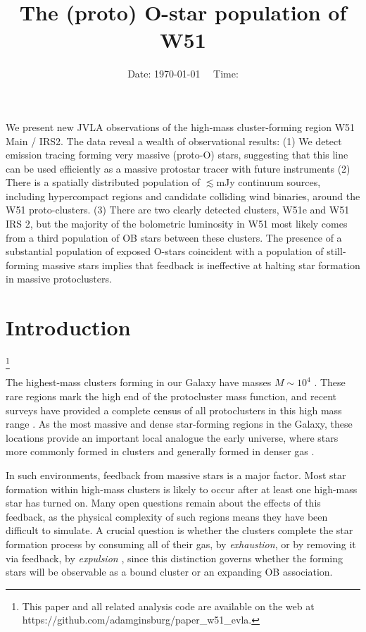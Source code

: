 



\title{The (proto) O-star population of W51}


\date{Date: \today ~~ Time: \currenttime}

\abstract
{
We present new JVLA observations of the high-mass cluster-forming region
W51 Main / IRS2.  The data reveal a wealth of observational results:
(1) We detect \ortho \twotwo emission tracing forming very massive (proto-O) stars,
suggesting that this line can be used efficiently as a massive protostar tracer
with future instruments
(2) There is a spatially distributed population of $\lesssim$mJy continuum sources,
including hypercompact \hii regions and candidate colliding wind binaries,
around the W51 proto-clusters.  
(3) There are two clearly detected clusters, W51e and W51 IRS 2, but the
majority of the bolometric luminosity in W51 most likely comes from a third
population of OB stars between these clusters.
The presence of a substantial population of exposed O-stars coincident with
a population of still-forming massive stars implies that feedback is ineffective
at halting star formation in massive protoclusters.
}

\maketitle


\section{Introduction}
\footnote{
This paper and all related analysis code are available on the web at
https://github.com/adamginsburg/paper\_w51\_evla.
}

The highest-mass clusters forming in our Galaxy have masses $M\sim10^4$ \msun.
These rare regions mark the high end of the protocluster mass function, and
recent surveys have provided a complete census of all protoclusters in this
high mass range \citep{Ginsburg2012a,Urquhart2013b,Urquhart2014b}.  As the
most massive and dense star-forming regions in the Galaxy, these locations
provide an important local analogue the early universe, where stars more
commonly formed in clusters and generally formed in denser gas
\citep{Kruijssen2012a,Madau2014a}.

In such environments, feedback from massive stars is a major factor.  Most star
formation within high-mass clusters is likely to occur after at least one
high-mass star has turned on.  Many open questions remain about the effects of
this feedback, as the physical complexity of such regions means they have been
difficult to simulate.  A crucial question is whether the clusters complete the
star formation process by consuming all of their gas, by \emph{exhaustion}, or
by removing it via feedback, by \emph{expulsion}
\citep{Longmore2014a,Matzner2015a}, since this distinction governs whether the
forming stars will be observable as a bound cluster or an expanding OB
association.

